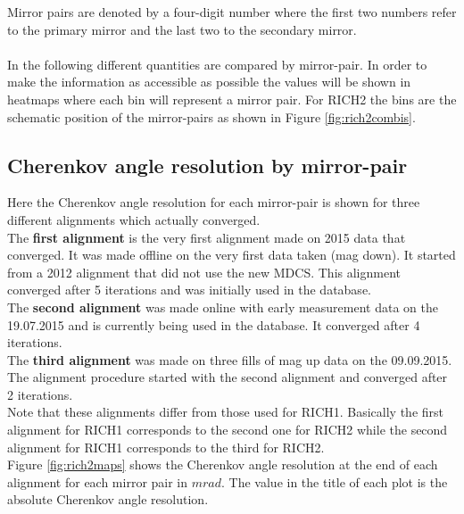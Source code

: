 Mirror pairs are denoted by a four-digit number where the first two numbers refer to the primary mirror and the last two to the secondary mirror.\\
\\
In the following different quantities are compared by mirror-pair. In order to make the information as accessible as possible the values will be shown in heatmaps where each bin will represent a mirror pair. For RICH2 the bins are the schematic position of the mirror-pairs as shown in Figure \ref{fig:rich2combis}.
\\
\clearpage
\subsection{Cherenkov angle resolution by mirror-pair}
Here the Cherenkov angle resolution for each mirror-pair is shown for three different alignments which actually converged. \\
The \textbf{first alignment} is the very first alignment made on 2015 data that converged. It was made offline on the very first data taken (mag down). It started from a 2012 alignment that did not use the new MDCS. This alignment converged after 5 iterations and was initially used in the database.\\
The \textbf{second alignment} was made online with early measurement data on the 19.07.2015 and is currently being used in the database. It converged after 4 iterations.\\
The \textbf{third alignment} was made on three fills of mag up data on the 09.09.2015. The alignment procedure started with the second alignment and converged after 2 iterations.\\
Note that these alignments differ from those used for RICH1. Basically the first alignment for RICH1 corresponds to the second one for RICH2 while the second alignment for RICH1 corresponds to the third for RICH2.\\
Figure \ref{fig:rich2maps} shows the Cherenkov angle resolution at the end of each alignment for each mirror pair in $mrad$. The value in the title of each plot is the absolute Cherenkov angle resolution.

